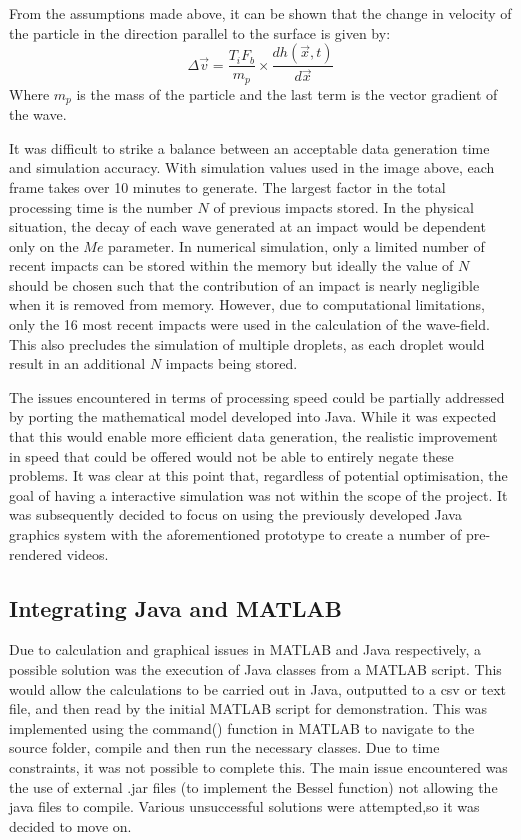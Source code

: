 From the assumptions made above, it can be shown that the change in velocity of the particle in the direction parallel to the surface is given by:
\begin{equation} \Delta \vec{v} = \frac{T_i  F_b}{m_p} \times \frac{dh(\vec{x} , t)}{d\vec{x}}\end{equation}
Where $m_p$ is the mass of the particle and the last term is the vector gradient of the wave.


It was difficult to strike a balance between an acceptable data generation time and simulation accuracy. With simulation values used in the image above, each frame takes over 10 minutes to generate. The largest factor in the total processing time is the number $N$ of previous impacts stored. In the physical situation, the decay of each wave generated at an impact would be dependent only on the $Me$ parameter. \cite{couder11} In numerical simulation, only a limited number of recent impacts can be stored within the memory but ideally the value of $N$ should be chosen such that the contribution of an impact is nearly negligible when it is removed from memory. However, due to computational limitations, only the 16 most recent impacts were used in the calculation of the wave-field. This also precludes the simulation of multiple droplets, as each droplet would result in an additional $N$ impacts being stored.

The issues encountered in terms of processing speed could be partially addressed by porting the mathematical model developed into Java.  While it was expected that this would enable more efficient data generation, the realistic improvement in speed that could be offered would not be able to entirely negate these problems.
It was clear at this point that, regardless of potential optimisation, the goal of having a interactive simulation was not within the scope of the project. It was subsequently  decided to focus on using the previously developed Java graphics system with the aforementioned prototype  to create a number of pre-rendered videos.

\subsection{Integrating Java and MATLAB}

Due to calculation and graphical issues in  MATLAB and Java respectively, a possible solution was the execution of Java classes from a MATLAB script. This would allow the calculations to be carried out in Java, outputted to a csv or text file, and then read by the initial MATLAB script for demonstration. This was implemented using the command() function in MATLAB to navigate to the source folder, compile and then run the necessary classes. Due to time constraints, it was not possible to complete this. The main issue encountered was the use of external .jar files (to implement the Bessel function) not allowing the java files to compile. Various unsuccessful solutions were attempted,so it was decided to move on.



